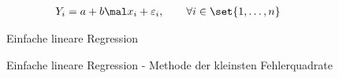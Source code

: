 \begin{beispiel}
\label{beisp3.5einfacheLineareRegression}
	\begin{align*}
		Y_i&=a+b\mal x_i+\varepsilon_i,\qquad\forall i\in\set{1,\ldots,n}
	\end{align*}

	\begin{figure}[H]
		\begin{center}
			
			\caption{Einfache lineare Regression}
		\end{center}
	\end{figure}
	
	\begin{figure}[H]
		\begin{center}
			
			\caption{Einfache lineare Regression - Methode der kleinsten Fehlerquadrate}
		\end{center}
	\end{figure}


\end{beispiel}
